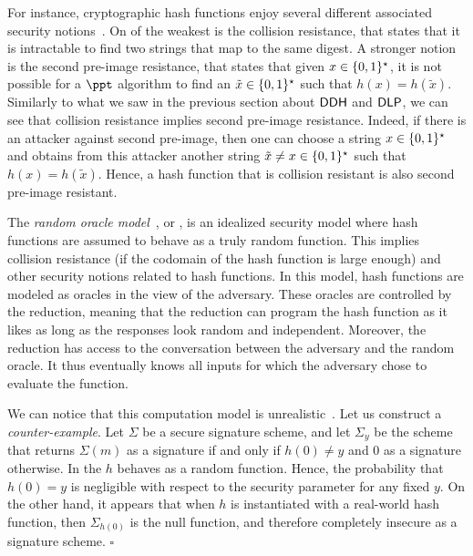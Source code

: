 For instance, cryptographic hash functions enjoy several different associated security notions~\cite{KL07}.
On of the weakest is the collision resistance, that states that it is intractable to find two strings that map to the same digest.
A stronger notion is the second pre-image resistance, that states that given $x \in \{0,1\}^\star_{}$, it is not possible for a $\ppt$ algorithm to find an $\tilde{x} \in \{0,1\}^\star_{}$ such that $h(x) = h(\tilde{x})$.
Similarly to what we saw in the previous section about $\textsf{DDH}$ and $\textsf{DLP}$, we can see that collision resistance implies second pre-image resistance.
Indeed, if there is an attacker against second pre-image, then one can choose a string $x \in \{0,1\}^\star_{}$ and obtains from this attacker another string $\tilde{x} \neq x \in \{0,1\}^\star_{}$ such that $h(x) = h(\tilde{x})$. Hence, a hash function that is collision resistant is also second pre-image resistant.

The \textit{random oracle model}~\cite{FS86,BR93}, or \ROM, is an idealized security model where hash functions are assumed to behave as a truly random function.
This implies collision resistance (if the codomain of the hash function is large enough) and other security notions related to hash functions.
In this model, hash functions are modeled as oracles in the view of the adversary.
These oracles are controlled by the reduction, meaning that the reduction can program the hash function as it likes as long as the responses look random and independent.
Moreover, the reduction has access to the conversation between the adversary and the random oracle. It thus eventually knows all inputs for which the adversary chose to evaluate the function.

We can notice that this computation model is unrealistic~\cite{CGH98}. Let us construct a \emph{counter-example}.
Let $\Sigma$ be a secure signature scheme, and let $\Sigma_y^{}$ be the scheme that returns $\Sigma(m)$ as a signature if and only if $h(0) \neq y$ and $0$ as a signature otherwise.
In the \ROM $h$ behaves as a random function.
Hence, the probability that $h(0) = y$ is negligible with respect to the security parameter for any fixed $y$.
On the other hand, it appears that when $h$ is instantiated with a real-world hash function, then $\Sigma_{h(0)}$ is the null function, and therefore completely insecure as a signature scheme. \hfill $\square$

